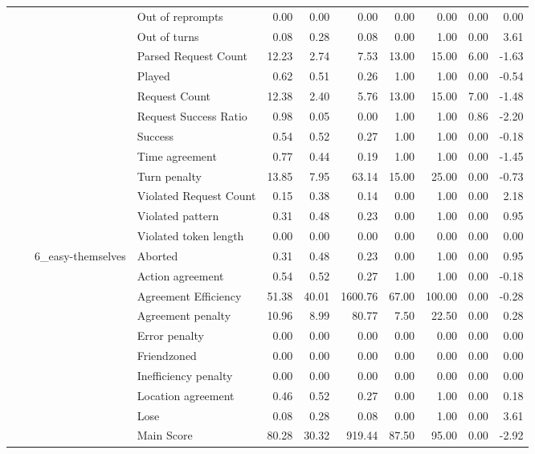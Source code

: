 \begin{tabular}{llllrrrrrrr}
 &  &  & Out of reprompts & 0.00 & 0.00 & 0.00 & 0.00 & 0.00 & 0.00 & 0.00 \\
 &  &  & Out of turns & 0.08 & 0.28 & 0.08 & 0.00 & 1.00 & 0.00 & 3.61 \\
 &  &  & Parsed Request Count & 12.23 & 2.74 & 7.53 & 13.00 & 15.00 & 6.00 & -1.63 \\
 &  &  & Played & 0.62 & 0.51 & 0.26 & 1.00 & 1.00 & 0.00 & -0.54 \\
 &  &  & Request Count & 12.38 & 2.40 & 5.76 & 13.00 & 15.00 & 7.00 & -1.48 \\
 &  &  & Request Success Ratio & 0.98 & 0.05 & 0.00 & 1.00 & 1.00 & 0.86 & -2.20 \\
 &  &  & Success & 0.54 & 0.52 & 0.27 & 1.00 & 1.00 & 0.00 & -0.18 \\
 &  &  & Time agreement & 0.77 & 0.44 & 0.19 & 1.00 & 1.00 & 0.00 & -1.45 \\
 &  &  & Turn penalty & 13.85 & 7.95 & 63.14 & 15.00 & 25.00 & 0.00 & -0.73 \\
 &  &  & Violated Request Count & 0.15 & 0.38 & 0.14 & 0.00 & 1.00 & 0.00 & 2.18 \\
 &  &  & Violated pattern & 0.31 & 0.48 & 0.23 & 0.00 & 1.00 & 0.00 & 0.95 \\
 &  &  & Violated token length & 0.00 & 0.00 & 0.00 & 0.00 & 0.00 & 0.00 & 0.00 \\
\cline{3-11}
 &  & \multirow[t]{27}{*}{6_easy-themselves} & Aborted & 0.31 & 0.48 & 0.23 & 0.00 & 1.00 & 0.00 & 0.95 \\
 &  &  & Action agreement & 0.54 & 0.52 & 0.27 & 1.00 & 1.00 & 0.00 & -0.18 \\
 &  &  & Agreement Efficiency & 51.38 & 40.01 & 1600.76 & 67.00 & 100.00 & 0.00 & -0.28 \\
 &  &  & Agreement penalty & 10.96 & 8.99 & 80.77 & 7.50 & 22.50 & 0.00 & 0.28 \\
 &  &  & Error penalty & 0.00 & 0.00 & 0.00 & 0.00 & 0.00 & 0.00 & 0.00 \\
 &  &  & Friendzoned & 0.00 & 0.00 & 0.00 & 0.00 & 0.00 & 0.00 & 0.00 \\
 &  &  & Inefficiency penalty & 0.00 & 0.00 & 0.00 & 0.00 & 0.00 & 0.00 & 0.00 \\
 &  &  & Location agreement & 0.46 & 0.52 & 0.27 & 0.00 & 1.00 & 0.00 & 0.18 \\
 &  &  & Lose & 0.08 & 0.28 & 0.08 & 0.00 & 1.00 & 0.00 & 3.61 \\
 &  &  & Main Score & 80.28 & 30.32 & 919.44 & 87.50 & 95.00 & 0.00 & -2.92 \\

\end{tabular}
